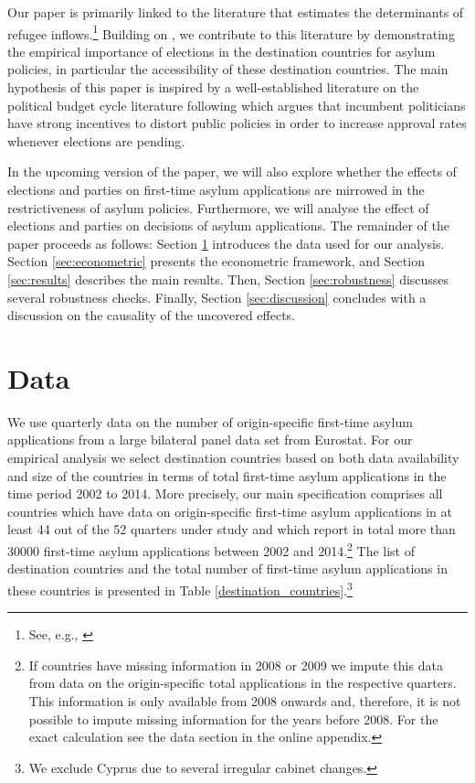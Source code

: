 \documentclass[a4paper,12pt]{article}
\begin{document}
Our paper is primarily linked to the literature that estimates the determinants of refugee inflows.\footnote{See, e.g., \citep{czaika2009, gudbrandsen2010, hatton2009, hatton2016, hatton2015,holzer2000, moore2007, neumayer2004, neumayer2005,toshkov2014}} Building on \citet{hatton2016}, we contribute to this literature by demonstrating the empirical importance of elections in the destination countries for asylum policies, in particular the accessibility of these destination countries. The main hypothesis of this paper is inspired by a well-established literature on the political budget cycle literature following \citet{nor75} which argues that incumbent politicians have strong incentives to distort public policies in order to increase approval rates whenever elections are pending.

In the upcoming version of the paper, we will also explore whether the effects of elections and parties on first-time asylum applications are mirrowed in the restrictiveness of asylum policies.  Furthermore, we will analyse the effect of elections and parties on decisions of asylum applications. The remainder of the paper proceeds as follows: Section \ref{sec:data} introduces the data used for our analysis. Section \ref{sec:econometric} presents the econometric framework, and Section \ref{sec:results} describes the main results. Then, Section \ref{sec:robustness} discusses several robustness checks. Finally, Section \ref{sec:discussion} concludes with a discussion on the causality of the uncovered effects.

 
\section{Data} \label{sec:data}

We use quarterly data on the number of  origin-specific first-time asylum applications from a large bilateral panel data set from Eurostat. For our empirical analysis we select destination countries based on both data availability and size of the countries in terms of total first-time asylum applications in the time period 2002 to 2014. More precisely, our main specification comprises all countries which have data on origin-specific first-time asylum applications in at least 44 out of the 52 quarters under study and which report in total more than 30000 first-time asylum applications between 2002 and 2014.\footnote{If countries have missing information in 2008 or 2009 we impute this data from data on the origin-specific total applications in the respective quarters. This information is only available from 2008 onwards and, therefore, it is not possible to impute missing information for the years before 2008. For the exact calculation see the data section in the online appendix.} The list of destination countries and the total number of first-time asylum applications in these countries is presented in Table \ref{destination_countries}.\footnote{We exclude Cyprus due to several irregular cabinet changes.}
\end{document}
